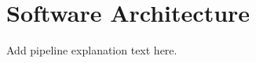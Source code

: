 \pagebreak
\chapter{Software Architecture}
\label{sec:software}

Add pipeline explanation text here.
